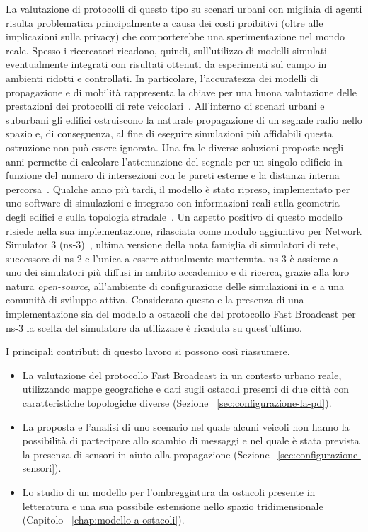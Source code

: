 La valutazione di protocolli di questo tipo su scenari urbani con migliaia di agenti risulta
problematica principalmente a causa dei costi proibitivi (oltre alle implicazioni sulla privacy)
che comporterebbe una sperimentazione nel mondo reale.
Spesso i ricercatori ricadono, quindi, sull'utilizzo di modelli simulati eventualmente integrati con risultati ottenuti
da esperimenti sul campo in ambienti ridotti e controllati.
In particolare, l'accuratezza dei modelli di propagazione e di mobilità rappresenta la chiave per una buona valutazione delle prestazioni
dei protocolli di rete veicolari~\cite{4020783}.
All'interno di scenari urbani e suburbani gli edifici ostruiscono la naturale propagazione di un segnale radio nello spazio
e, di conseguenza, al fine di eseguire simulazioni più affidabili questa ostruzione non può essere ignorata.
Una fra le diverse soluzioni proposte negli anni permette di calcolare l'attenuazione del segnale per un singolo edificio
in funzione del numero di intersezioni con le pareti esterne e la distanza interna percorsa~\cite{5720204}.
Qualche anno più tardi, il modello è stato ripreso, implementato per uno software di simulazioni
e integrato con informazioni reali sulla geometria degli edifici e sulla topologia stradale~\cite{Carpenter:2015:OMI:2756509.2756512}.
Un aspetto positivo di questo modello risiede nella sua implementazione, rilasciata
come modulo aggiuntivo per Network Simulator 3 (ns-3)~\cite{ns3Website},
ultima versione della nota famiglia di simulatori di rete, successore di ns-2
e l'unica a essere attualmente mantenuta.
ns-3 è assieme a \omnet~\cite{omnetWebsite} uno dei simulatori più diffusi
in ambito accademico e di ricerca, grazie alla loro natura \textit{open-source},
all'ambiente di configurazione delle simulazioni in \Cpp{} e a una comunità di sviluppo attiva.
Considerato questo e la presenza di una implementazione sia del modello a ostacoli
che del protocollo Fast Broadcast per ns-3 la scelta del simulatore da utilizzare
è ricaduta su quest'ultimo.

I principali contributi di questo lavoro si possono così riassumere.
\begin{itemize}[noitemsep]
	\item La valutazione del protocollo Fast Broadcast in un contesto urbano reale,
				utilizzando mappe geografiche e dati sugli ostacoli presenti di due città con caratteristiche topologiche diverse (Sezione ~\ref{sec:configurazione-la-pd}).
	\item La proposta e l'analisi di uno scenario nel quale alcuni veicoli non hanno la possibilità di partecipare allo scambio di messaggi
				e nel quale è stata prevista la presenza di sensori in aiuto alla propagazione (Sezione ~\ref{sec:configurazione-sensori}).
	\item Lo studio di un modello per l'ombreggiatura da ostacoli presente in letteratura e una sua possibile estensione nello spazio tridimensionale (Capitolo ~\ref{chap:modello-a-ostacoli}).
\end{itemize}
%
